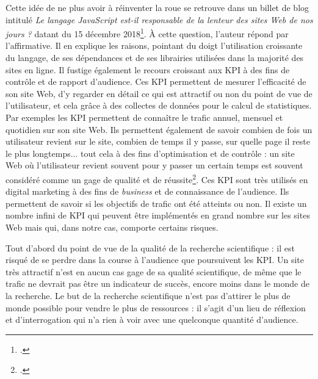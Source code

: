 \documentclass[a4paper,12pt,twoside]{book}
\begin{document}
Cette idée de ne plus avoir à réinventer la roue se retrouve dans un billet de blog intitulé \og \textit{Le langage JavaScript est-il
responsable de la lenteur des sites Web de nos jours ?} \fg datant du 15 décembre 2018\footcite{javascript}. À cette question, l'auteur répond par l'affirmative. Il en explique les raisons, pointant du doigt l'utilisation croissante du langage, de ses dépendances et de ses librairies utilisées dans la majorité des sites en ligne. Il fustige également le recours croissant aux \acrfull{KPI} à des fins de contrôle et de rapport d'audience. Ces \acrshort{KPI} permettent de mesurer l'\og efficacité \fg{} de son site Web, d'y regarder en détail ce qui est attractif ou non du point de vue de l'utilisateur, et cela grâce à des collectes de données pour le calcul de statistiques. Par exemples les \acrshort{KPI} permettent de connaître le trafic annuel, mensuel et quotidien sur son site Web. Ils permettent également de savoir combien de fois un utilisateur revient sur le site, combien de temps il y passe, sur quelle page il reste le plus longtemps... tout cela à des fins d'optimisation et de contrôle : un site Web où l'utilisateur revient souvent pour y passer un certain temps est souvent considéré comme un gage de qualité et de réussite\footcite{storm_website_2022}. Ces \acrshort{KPI} sont très utilisés en digital marketing à des fins de \textit{business} et de connaissance de l'audience. Ils permettent de savoir si les objectifs de trafic ont été atteints ou non. Il existe un nombre infini de \acrshort{KPI} qui peuvent être implémentés en grand nombre sur les sites Web mais qui, dans notre cas, comporte certains risques.

Tout d'abord du point de vue de la qualité de la recherche scientifique : il est risqué de se perdre dans la course à l'audience que poursuivent les \acrshort{KPI}. Un site très attractif n'est en aucun cas gage de sa qualité scientifique, de même que le trafic ne devrait pas être un indicateur de succès, encore moins dans le monde de la recherche. Le but de la recherche scientifique n'est pas d'attirer le plus de monde possible pour vendre le plus de ressources : il s'agit d'un lieu de réflexion et d'interrogation qui n'a rien à voir avec une quelconque quantité d'audience.
\end{document}
